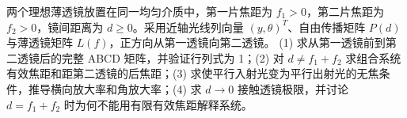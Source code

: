 两个理想薄透镜放置在同一均匀介质中，第一片焦距为 \(f_1>0\)，第二片焦距为 \(f_2>0\)，镜间距离为 \(d\ge0\)。采用近轴光线列向量 \((y,\theta)^T\)、自由传播矩阵 \(P(d)\) 与薄透镜矩阵 \(L(f)\)，正方向从第一透镜向第二透镜。
(1) 求从第一透镜前到第二透镜后的完整 ABCD 矩阵，并验证行列式为 1；(2) 对 \(d\ne f_1+f_2\) 求组合系统有效焦距和距第二透镜的后焦距；(3) 求使平行入射光变为平行出射光的无焦条件，推导横向放大率和角放大率；(4) 求 \(d\to0\) 接触透镜极限，并讨论 \(d=f_1+f_2\) 时为何不能用有限有效焦距解释系统。
